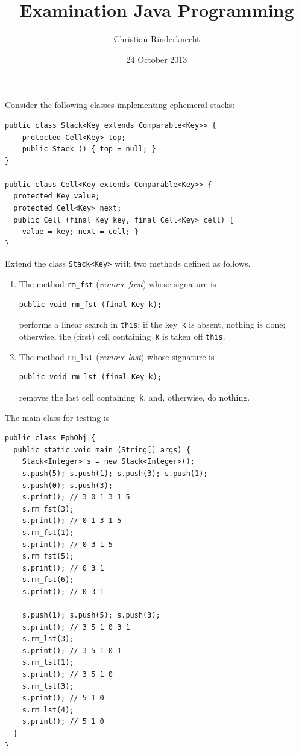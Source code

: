 \documentclass[11pt,a4paper]{article}
\title{Examination Java Programming}
\author{Christian Rinderknecht}
\date{24 October 2013}
\begin{document}
\maketitle

\noindent Consider the following classes implementing ephemeral
stacks:
\begin{verbatim}
public class Stack<Key extends Comparable<Key>> {
    protected Cell<Key> top;
    public Stack () { top = null; }
}

public class Cell<Key extends Comparable<Key>> {
  protected Key value;
  protected Cell<Key> next;
  public Cell (final Key key, final Cell<Key> cell) {
    value = key; next = cell; }
}
\end{verbatim}
Extend the class \texttt{Stack<Key>} with two methods defined as follows.
\begin{enumerate}

  \item The method \texttt{rm\_fst} (\emph{remove first}) whose
  signature is
\begin{verbatim}
public void rm_fst (final Key k);
\end{verbatim}
  performs a linear search in \texttt{this}: if the key~\texttt{k} is
  absent, nothing is done; otherwise, the (first) cell
  containing~\texttt{k} is taken off \texttt{this}.

\item The method \texttt{rm\_lst} (\emph{remove last}) whose signature
  is
\begin{verbatim}
public void rm_lst (final Key k);
\end{verbatim}
removes the last cell containing~\texttt{k}, and, otherwise, do nothing.
\end{enumerate}

\newpage

\noindent The main class for testing is
\begin{verbatim}
public class EphObj {
  public static void main (String[] args) {
    Stack<Integer> s = new Stack<Integer>();
    s.push(5); s.push(1); s.push(3); s.push(1);
    s.push(0); s.push(3);
    s.print(); // 3 0 1 3 1 5
    s.rm_fst(3);
    s.print(); // 0 1 3 1 5
    s.rm_fst(1);
    s.print(); // 0 3 1 5
    s.rm_fst(5);
    s.print(); // 0 3 1
    s.rm_fst(6);
    s.print(); // 0 3 1

    s.push(1); s.push(5); s.push(3);
    s.print(); // 3 5 1 0 3 1
    s.rm_lst(3);
    s.print(); // 3 5 1 0 1
    s.rm_lst(1);
    s.print(); // 3 5 1 0
    s.rm_lst(3);
    s.print(); // 5 1 0
    s.rm_lst(4);
    s.print(); // 5 1 0
  }
}
\end{verbatim}
\end{document}
